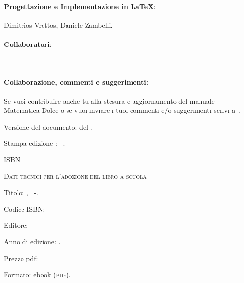 {{\paragraph{Progettazione e Implementazione in \LaTeX:} 
          {Dimitrios Vrettos, Daniele Zambelli}.

\paragraph{Collaboratori:} {\texcol}.

\paragraph{Collaborazione, commenti e suggerimenti:} Se vuoi contribuire 
anche tu alla stesura e aggiornamento 
del manuale Matematica Dolce o se  vuoi inviare i tuoi commenti e/o 
suggerimenti scrivi 
a~.

\vspace{2ex}
 Versione del documento: {\docvers} del {\oggi}.

 Stampa edizione \edizione : \mese\ \anno.

 ISBN \mcisbn

\vspace{2ex}
 {\scshape{Dati tecnici per l'adozione del libro a scuola}}

 Titolo: \serie, \titolo\ -\edizione.

 Codice ISBN: \mcisbn 

 Editore: %

 Anno di edizione: \anno.

 Prezzo pdf: %

 Formato: ebook (\scshape{pdf}).
}}
